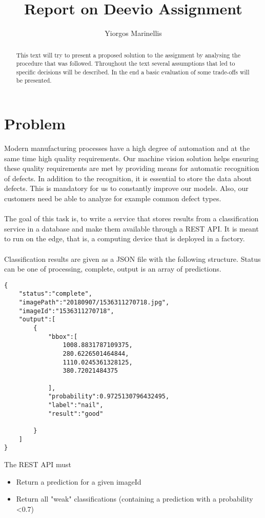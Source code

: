 \documentclass[a4paper,10pt]{article}
\title{Report on Deevio Assignment}
\author{Yiorgos Marinellis}
\begin{document}
\maketitle

\begin{abstract}
This text will try to present a proposed solution to the assignment
by analysing the procedure that was followed. Throughout the text
several assumptions that led to specific decisions will be described.
In the end a basic evaluation of some trade-offs will be presented.
\end{abstract}

\section{Problem}
Modern manufacturing processes have a high degree of automation and at the same time high
quality requirements. Our machine vision solution helps ensuring these quality requirements are
met by providing means for automatic recognition of defects. In addition to the recognition, it is
essential to store the data about defects. This is mandatory for us to constantly improve our
models. Also, our customers need be able to analyze for example common defect types.\\
\\
The goal of this task is, to write a service that stores results from a classification service in a
database and make them available through a REST API. It is meant to run on the edge, that is, a
computing device that is deployed in a factory.\\
\\
Classification results are given as a JSON file with the following structure.
Status can be one of {processing, complete}, output is an array of predictions.
\newpage
\begin{lstlisting}
{
    "status":"complete",
    "imagePath":"20180907/1536311270718.jpg",
    "imageId":"1536311270718",
    "output":[
        {
            "bbox":[
                1008.8831787109375,
                280.6226501464844,
                1110.0245361328125,
                380.72021484375

            ],
            "probability":0.9725130796432495,
            "label":"nail",
            "result":"good"

        }
    ]
}
\end{lstlisting}


The REST API must
\begin{itemize}
    \item Return a prediction for a given imageId
    \item Return all "weak" classifications (containing a prediction with a probability <0.7)
\end{itemize}
\end{document}
